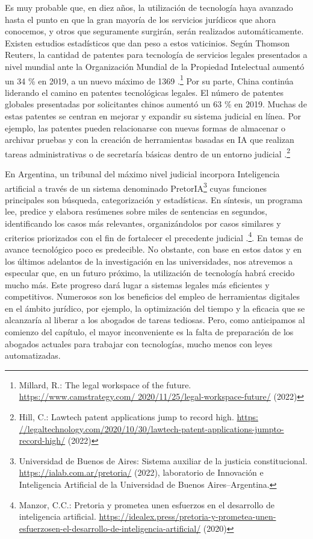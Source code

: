 \documentclass[12pt]{report} %
\begin{document}
Es muy probable que, en diez años, la utilización de tecnología haya avanzado hasta el punto en que la gran mayoría de los servicios jurídicos que ahora conocemos, y otros que seguramente surgirán, serán realizados automáticamente. Existen estudios estadísticos que dan peso a estos vaticinios. Según Thomson Reuters, la cantidad de patentes para tecnología de servicios legales presentados a nivel mundial ante la Organización Mundial de la Propiedad Intelectual aumentó un 34 \% en 2019, a un nuevo máximo de 1369 .\footnote{Millard, R.: The legal workspace of the future. \url{https://www.camstrategy.com/ 2020/11/25/legal-workspace-future/} (2022)} Por su parte, China continúa liderando el camino en patentes tecnológicas legales. El número de patentes globales presentadas por solicitantes chinos aumentó un 63 \% en 2019. Muchas de estas patentes se centran en mejorar y expandir su sistema judicial en línea. Por ejemplo, las patentes pueden relacionarse con nuevas formas de almacenar o archivar pruebas y con la creación de herramientas basadas en IA que realizan tareas administrativas o de secretaría básicas dentro de un entorno judicial .\footnote{Hill, C.: Lawtech patent applications jump to record high. \url{https: //legaltechnology.com/2020/10/30/lawtech-patent-applications-jumpto-record-high/} (2022)} 

En Argentina, un tribunal del máximo nivel judicial incorpora Inteligencia artificial a través de un sistema denominado PretorIA\footnote{Universidad  de Buenos de Aires: Sistema auxiliar de la justicia constitucional. \url{https://ialab.com.ar/pretoria/} (2022), laboratorio de Innovación e Inteligencia Artificial de la Universidad de Buenos Aires–Argentina.}  cuyas funciones principales son búsqueda, categorización y estadísticas. En síntesis, un programa lee, predice y elabora resúmenes sobre miles de sentencias en segundos, identificando los casos más relevantes, organizándolos por casos similares y criterios priorizados con el fin de fortalecer el precedente judicial .\footnote{Manzor, C.C.: Pretoria y prometea unen esfuerzos en el desarrollo de inteligencia artificial. \url{https://idealex.press/pretoria-y-prometea-unen-esfuerzosen-el-desarrollo-de-inteligencia-artificial/} (2020)}. En temas de avance tecnológico poco es predecible. No obstante, con base en estos datos y en los últimos adelantos de la investigación en las universidades, nos atrevemos a especular que, en un futuro próximo, la utilización de tecnología habrá crecido mucho más. Este progreso dará lugar a sistemas legales más eficientes y competitivos. Numerosos son los beneficios del empleo de herramientas digitales en el ámbito jurídico, por ejemplo, la optimización del tiempo y la eficacia que se alcanzaría al liberar a los abogados de tareas tediosas. Pero, como anticipamos al comienzo del capítulo, el mayor inconveniente es la falta de preparación de los abogados actuales para trabajar con tecnologías, mucho menos con leyes automatizadas.
\end{document}
